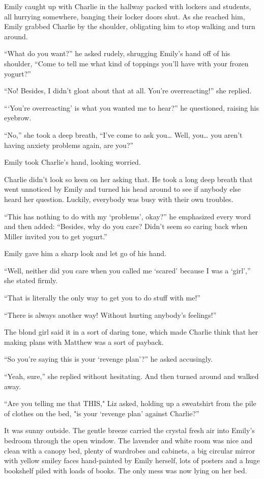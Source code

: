 Emily caught up with Charlie in the hallway packed with lockers and students, all hurrying somewhere, banging their locker doors shut. As she reached him, Emily grabbed Charlie by the shoulder, obligating him to stop walking and turn around.

“What do you want?” he asked rudely, shrugging Emily's hand off of his shoulder, “Come to tell me what kind of toppings you'll have with your frozen yogurt?”

“No! Besides, I didn't gloat about that at all. You're overreacting!” she replied.

“‘You're overreacting' is what you wanted me to hear?” he questioned, raising his eyebrow.

“No,” she took a deep breath, “I've come to ask you… Well, you… you aren't having anxiety problems again, are you?”

Emily took Charlie's hand, looking worried.

Charlie didn't look so keen on her asking that. He took a long deep breath that went unnoticed by Emily and turned his head around to see if anybody else heard her question. Luckily, everybody was busy with their own troubles.

“This has nothing to do with my ‘problems', okay?” he emphasized every word and then added: “Besides, why do you care? Didn't seem so caring back when Miller invited you to get yogurt.”

Emily gave him a sharp look and let go of his hand.

“Well, neither did you care when you called me ‘scared' because I was a ‘girl',” she stated firmly.

“That is literally the only way to get you to do stuff with me!”

“There is always another way! Without hurting anybody's feelings!”

The blond girl said it in a sort of daring tone, which made Charlie think that her making plans with Matthew was a sort of payback.

“So you're saying this is your ‘revenge plan'?” he asked accusingly.

“Yeah, sure,” she replied without hesitating. And then turned around and walked away.

\bigskip

“Are you telling me that THIS," Liz asked, holding up a sweatshirt from the pile of clothes on the bed, "is your ‘revenge plan' against Charlie?”

It was sunny outside. The gentle breeze carried the crystal fresh air into Emily's bedroom through the open window. The lavender and white room was nice and clean with a canopy bed, plenty of wardrobes and cabinets, a big circular mirror with yellow smiley faces hand-painted by Emily herself, lots of posters and a huge bookshelf piled with loads of books. The only mess was now lying on her bed.

